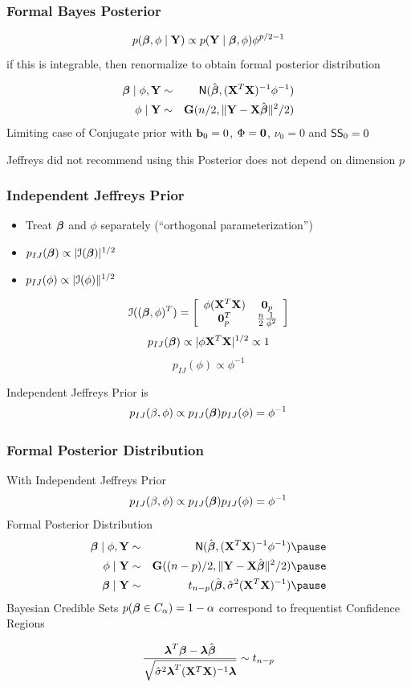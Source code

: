 \documentclass[]{beamer}
\begin{document}
\begin{frame}
  \frametitle{Formal Bayes Posterior}
$$  p(\boldsymbol{\beta}, \phi \mid \mathbf{Y}) \propto p(\mathbf{Y} \mid \boldsymbol{\beta}, \phi)  \phi^{p/2 - 1} $$
\pause
if this is integrable, then renormalize to obtain formal posterior
distribution \pause


\begin{eqnarray*}
  \boldsymbol{\beta} \mid \phi, \mathbf{Y} & \sim & \textsf{N}(\hat{\boldsymbol{\beta}}, (\mathbf{X}^T\mathbf{X})^{-1} \phi^{-1}) \\
  \phi \mid \mathbf{Y} & \sim& \mathbf{G}(n/2, \| \mathbf{Y} - \mathbf{X}\hat{\boldsymbol{\beta}} \|^2/2)
\end{eqnarray*} \pause
Limiting case of Conjugate prior with $\mathbf{b}_0 = 0$, $\Phi = \mathbf{0}$,
$\nu_0 = 0$ and $\textsf{SS}_0 = 0$ \pause

  \pause

\vfill
Jeffreys did not recommend using this Posterior does not depend on dimension $p$
\end{frame}
\begin{frame}
  \frametitle{Independent Jeffreys Prior}
  \begin{itemize}
  \item  Treat $\boldsymbol{\beta}$ and $\phi$ separately  (``orthogonal
    parameterization'') \pause
  \item $p_{IJ}(\boldsymbol{\beta}) \propto |{\cal{I}}(\boldsymbol{\beta})|^{1/2}$ \pause
\item $p_{IJ}(\phi) \propto |{\cal{I}}(\phi)\|^{1/2}$ \pause
  \end{itemize}
$$
{\cal{I}}((\boldsymbol{\beta}, \phi)^T)  =  \left[
  \begin{array}{cc}
    \phi (\mathbf{X}^T\mathbf{X}) & \mathbf{0}_p \\
  \mathbf{0}_p^T & \frac{n}{2} \frac{1}{\phi^2}
  \end{array}
\right]
$$
\pause
$$p_{IJ}(\boldsymbol{\beta}) \propto |\phi \mathbf{X}^T\mathbf{X}|^{1/2} \propto 1$$ \pause
$$p_{IJ}(\phi) \propto \phi^{-1}$$ \pause

Independent Jeffreys Prior is
$$p_{IJ}(\beta, \phi) \propto p_{IJ}(\boldsymbol{\beta}) p_{IJ}(\phi) = \phi^{-1}$$

\end{frame}
\begin{frame}
  \frametitle{Formal Posterior Distribution}
  With Independent Jeffreys Prior
$$p_{IJ}(\beta, \phi) \propto p_{IJ}(\boldsymbol{\beta}) p_{IJ}(\phi) = \phi^{-1}$$
\pause
Formal Posterior Distribution
\pause
\begin{eqnarray*}
  \b \mid \phi, \Y & \sim & \N(\bhat, (\X^T\X)^{-1} \phi^{-1}) \pause \\
  \phi \mid \Y & \sim& \G((n-p)/2, \| \Y - \X\bhat \|^2/2) \pause\\
\b \mid \Y & \sim & t_{n-p}(\bhat, \shat (\X^T\X)^{-1})\pause
\end{eqnarray*}
Bayesian Credible Sets
$p(\boldsymbol{\beta} \in C_\alpha) = 1- \alpha$ correspond to frequentist Confidence
Regions

$$\frac{\boldsymbol{\lambda}^T\boldsymbol{\beta} - \boldsymbol{\lambda}\hat{\boldsymbol{\beta}}}
{\sqrt{{\hat{\sigma}}^2 \boldsymbol{\lambda}^T(\mathbf{X}^T\mathbf{X})^{-1} \boldsymbol{\lambda}}} \sim t_{n-p}$$

\end{frame}
\end{document}
